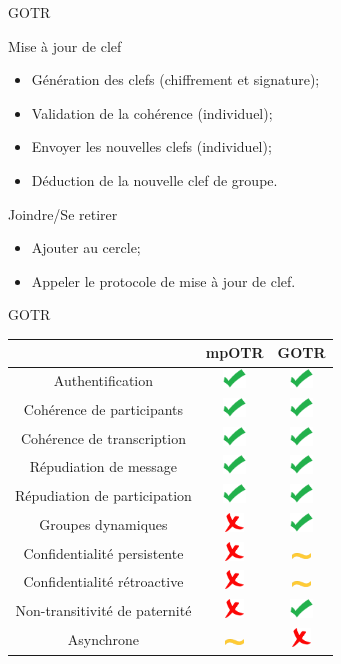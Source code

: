 \documentclass{beamer}
\newcommand{\okay}{\includegraphics[height=0.5cm]{img/check.png}}
\newcommand{\nope}{\includegraphics[height=0.5cm]{img/cross.png}}
\newcommand{\sortof}{\includegraphics[width=0.5cm]{img/tilde.png}}
\begin{document}
\begin{frame}{GOTR}

	\begin{block}{Mise à jour de clef}
		\begin{itemize}
      \item Génération des clefs (chiffrement et signature);
      \item Validation de la cohérence (individuel);
      \item Envoyer les nouvelles clefs (individuel);
			\item Déduction de la nouvelle clef de groupe.
		\end{itemize}
  \end{block}

	\begin{block}{Joindre/Se retirer}
		\begin{itemize}
			\item Ajouter au cercle;
			\item Appeler le protocole de mise à jour de clef.
		\end{itemize}
  \end{block}
\end{frame}

\begin{frame}{GOTR}
	\center
  	\begin{tabular}{c|cc}
			                              & mpOTR   & GOTR    \\
			\hline
  		Authentification              & \okay   & \okay   \\
  		\hline
  		Cohérence de participants     & \okay   & \okay   \\
  		Cohérence de transcription    & \okay   & \okay   \\
  		\hline
  		Répudiation de message        & \okay   & \okay   \\
  		Répudiation de participation  & \okay   & \okay   \\
  		\hline
  		Groupes dynamiques            & \nope   & \okay   \\
  		\hline
  		Confidentialité persistente   & \nope   & \sortof \\
  		Confidentialité rétroactive   & \nope   & \sortof \\
  		Non-transitivité de paternité & \nope   & \okay   \\
  		\hline
  		Asynchrone                    & \sortof & \nope
    \end{tabular}
\end{frame}
\end{document}
